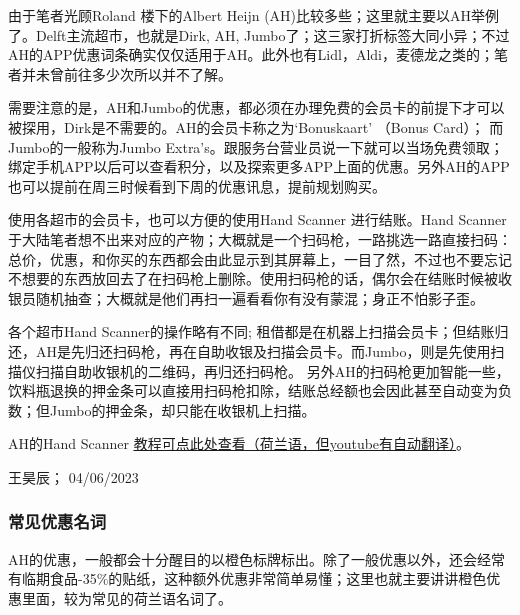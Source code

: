 由于笔者光顾Roland 楼下的Albert Heijn (AH)比较多些；这里就主要以AH举例了。Delft主流超市，也就是Dirk, AH, Jumbo了；这三家打折标签大同小异；不过AH的APP优惠词条确实仅仅适用于AH。此外也有Lidl，Aldi，麦德龙之类的；笔者并未曾前往多少次所以并不了解。

需要注意的是，AH和Jumbo的优惠，都必须在办理免费的会员卡的前提下才可以被探用，Dirk是不需要的。AH的会员卡称之为‘Bonuskaart’ （Bonus Card）； 而Jumbo的一般称为Jumbo Extra's。跟服务台营业员说一下就可以当场免费领取；绑定手机APP以后可以查看积分，以及探索更多APP上面的优惠。另外AH的APP也可以提前在周三时候看到下周的优惠讯息，提前规划购买。

使用各超市的会员卡，也可以方便的使用Hand Scanner 进行结账。Hand Scanner于大陆笔者想不出来对应的产物；大概就是一个扫码枪，一路挑选一路直接扫码：总价，优惠，和你买的东西都会由此显示到其屏幕上，一目了然，不过也不要忘记不想要的东西放回去了在扫码枪上删除。使用扫码枪的话，偶尔会在结账时候被收银员随机抽查；大概就是他们再扫一遍看看你有没有蒙混；身正不怕影子歪。

各个超市Hand Scanner的操作略有不同; 租借都是在机器上扫描会员卡；但结账归还，AH是先归还扫码枪，再在自助收银及扫描会员卡。而Jumbo，则是先使用扫描仪扫描自助收银机的二维码，再归还扫码枪。 另外AH的扫码枪更加智能一些，饮料瓶退换的押金条可以直接用扫码枪扣除，结账总经额也会因此甚至自动变为负数；但Jumbo的押金条，却只能在收银机上扫描。

AH的Hand Scanner \href{https://www.youtube.com/watch?v=7MSqE_vt5Po}{\uline{教程可点此处查看（荷兰语，但youtube有自动翻译）}}。
\begin{flushright}
王昊辰； 04/06/2023
\end{flushright}



\subsubsection{常见优惠名词}
AH的优惠，一般都会十分醒目的以橙色标牌标出。除了一般优惠以外，还会经常有临期食品-35\%的贴纸，这种额外优惠非常简单易懂；这里也就主要讲讲橙色优惠里面，较为常见的荷兰语名词了。

